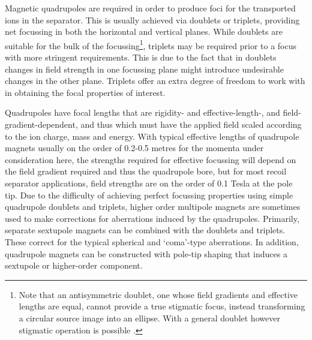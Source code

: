 Magnetic quadrupoles are required in order to produce foci for the transported ions in the separator. This is usually achieved via doublets or triplets, providing net focussing in both the horizontal and vertical planes. While doublets are suitable for the bulk of the focussing\footnote{Note that an antisymmetric doublet, one whose field gradients and effective lengths are equal, cannot provide a true stigmatic focus, instead transforming a circular source image into an ellipse. With a general doublet however stigmatic operation is possible \cite{reg67}.}, triplets may be required prior to a focus with more stringent requirements. This is due to the fact that in doublets changes in field strength in one focussing plane might introduce undesirable changes in the other plane. Triplets offer an extra degree of freedom to work with in obtaining the focal properties of interest.  

Quadrupoles have focal lengths that are rigidity- and effective-length-, and field-gradient-dependent, and thus which must have the applied field scaled according to the ion charge, mass and energy.  With typical effective lengths of quadrupole magnets usually on the order of 0.2-0.5 metres for the momenta under consideration here, the strengths required for effective focussing will depend on the field gradient required and thus the quadrupole bore, but for most recoil separator applications, field strengths are on the order of 0.1 Tesla at the pole tip. Due to the difficulty of achieving perfect focussing properties using simple quadrupole doublets and triplets, higher order multipole magnets are sometimes used to make corrections for aberrations induced by the quadrupoles. Primarily, separate sextupole magnets can be combined with the doublets and triplets. These correct for the typical spherical and `coma'-type aberrations. In addition, quadrupole magnets can be constructed with pole-tip shaping that induces a sextupole or higher-order component.  


